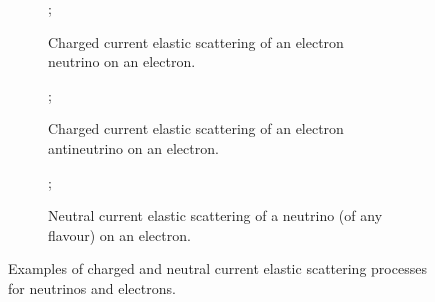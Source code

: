 \begin{figure}[h]
  \begin{subfigure}[t]{0.32\textwidth}
    \centering
    ;
    \caption{Charged current elastic scattering of an electron neutrino on an electron.}
    \label{fig:coherentScattering:nue}
  \end{subfigure}
  \hfill
  \begin{subfigure}[t]{0.32\textwidth}
    ;
    \caption{Charged current elastic scattering of an electron antineutrino on an electron.}
    \label{fig:coherentScattering:anue}
  \end{subfigure}
  \begin{subfigure}[t]{0.32\textwidth}
    \centering
    ;
    \caption{Neutral current elastic scattering of a neutrino (of any flavour) on an electron.}
    \label{fig:coherentScattering:nul}
  \end{subfigure}
  \caption[Neutrino elastic scattering processes.]{Examples of charged and neutral current elastic scattering processes for neutrinos and electrons.}
  \label{fig:coherentScattering}
\end{figure}

